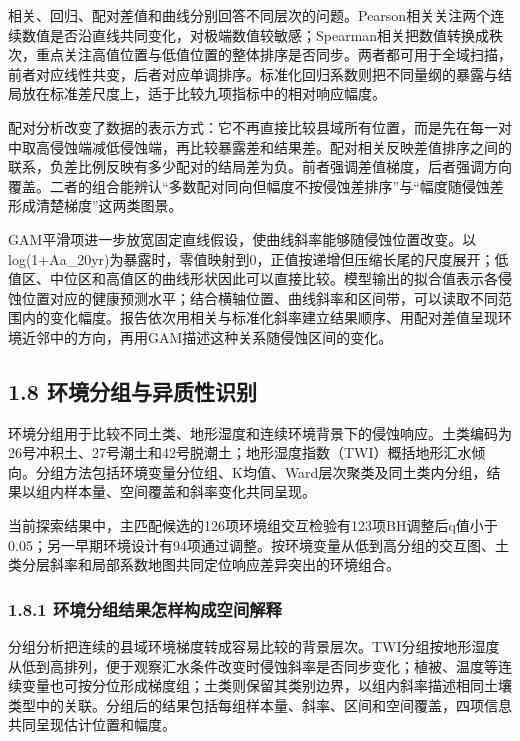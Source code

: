 \documentclass[
  11pt,
  a4paper,
]{ctexart}
\begin{document}
相关、回归、配对差值和曲线分别回答不同层次的问题。Pearson相关关注两个连续数值是否沿直线共同变化，对极端数值较敏感；Spearman相关把数值转换成秩次，重点关注高值位置与低值位置的整体排序是否同步。两者都可用于全域扫描，前者对应线性共变，后者对应单调排序。标准化回归系数则把不同量纲的暴露与结局放在标准差尺度上，适于比较九项指标中的相对响应幅度。

配对分析改变了数据的表示方式：它不再直接比较县域所有位置，而是先在每一对中取高侵蚀端减低侵蚀端，再比较暴露差和结果差。配对相关反映差值排序之间的联系，负差比例反映有多少配对的结局差为负。前者强调差值梯度，后者强调方向覆盖。二者的组合能辨认``多数配对同向但幅度不按侵蚀差排序''与``幅度随侵蚀差形成清楚梯度''这两类图景。

GAM平滑项进一步放宽固定直线假设，使曲线斜率能够随侵蚀位置改变。以log(1+Aa\_20yr)为暴露时，零值映射到0，正值按递增但压缩长尾的尺度展开；低值区、中位区和高值区的曲线形状因此可以直接比较。模型输出的拟合值表示各侵蚀位置对应的健康预测水平；结合横轴位置、曲线斜率和区间带，可以读取不同范围内的变化幅度。报告依次用相关与标准化斜率建立结果顺序、用配对差值呈现环境近邻中的方向，再用GAM描述这种关系随侵蚀区间的变化。

\hypertarget{ux73afux5883ux5206ux7ec4ux4e0eux5f02ux8d28ux6027ux8bc6ux522b}{%
\subsection{1.8
环境分组与异质性识别}\label{ux73afux5883ux5206ux7ec4ux4e0eux5f02ux8d28ux6027ux8bc6ux522b}}

环境分组用于比较不同土类、地形湿度和连续环境背景下的侵蚀响应。土类编码为26号冲积土、27号潮土和42号脱潮土；地形湿度指数（TWI）概括地形汇水倾向。分组方法包括环境变量分位组、K均值、Ward层次聚类及同土类内分组，结果以组内样本量、空间覆盖和斜率变化共同呈现。

当前探索结果中，主匹配候选的126项环境组交互检验有123项BH调整后q值小于0.05；另一早期环境设计有94项通过调整。按环境变量从低到高分组的交互图、土类分层斜率和局部系数地图共同定位响应差异突出的环境组合。

\hypertarget{ux73afux5883ux5206ux7ec4ux7ed3ux679cux600eux6837ux6784ux6210ux7a7aux95f4ux89e3ux91ca}{%
\subsubsection{1.8.1
环境分组结果怎样构成空间解释}\label{ux73afux5883ux5206ux7ec4ux7ed3ux679cux600eux6837ux6784ux6210ux7a7aux95f4ux89e3ux91ca}}

分组分析把连续的县域环境梯度转成容易比较的背景层次。TWI分组按地形湿度从低到高排列，便于观察汇水条件改变时侵蚀斜率是否同步变化；植被、温度等连续变量也可按分位形成梯度组；土类则保留其类别边界，以组内斜率描述相同土壤类型中的关联。分组后的结果包括每组样本量、斜率、区间和空间覆盖，四项信息共同呈现估计位置和幅度。
\end{document}
